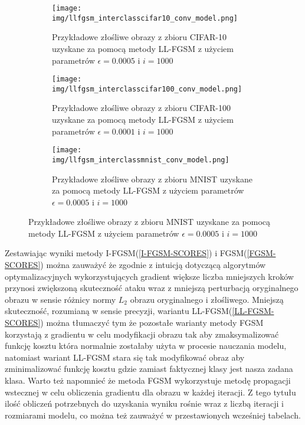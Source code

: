 \documentclass{article}
\begin{document}
\begin{figure}[h!]
    \caption{Przykłady wygenerowanych złośliwych przykładów z zadaną klasą za pomocą metody LL-FGSM}

    \begin{subfigure}[t]{0.48\textwidth}
        \texttt{[image: img/llfgsm\_interclasscifar10\_conv\_model.png]}
        \caption{Przykładowe złośliwe obrazy z zbioru CIFAR-10 uzyskane za pomocą metody LL-FGSM z użyciem parametrów \(\epsilon=0.0005\) i \(i=1000\)}
        \label{fig:cifar10_grid_llfgsm}
    \end{subfigure}%
    \hfill
    \begin{subfigure}[t]{0.48\textwidth}
        \texttt{[image: img/llfgsm\_interclasscifar100\_conv\_model.png]}
        \caption{Przykładowe złośliwe obrazy z zbioru CIFAR-100 uzyskane za pomocą metody LL-FGSM z użyciem parametrów \(\epsilon=0.0001\) i \(i=1000\)}
        \label{fig:cifar100_grid_llfgsm}
    \end{subfigure}%

    \begin{subfigure}[t]{0.48\textwidth}
        \texttt{[image: img/llfgsm\_interclassmnist\_conv\_model.png]}
        \caption{Przykładowe złośliwe obrazy z zbioru MNIST uzyskane za pomocą metody LL-FGSM z użyciem parametrów \(\epsilon=0.0005\) i \(i=1000\)}
        \label{fig:mnist_grid_llfgsm}
    \end{subfigure}%


\end{figure}

Zestawiając wyniki metody I-FGSM(\ref{I-FGSM-SCORES}) i FGSM(\ref{FGSM-SCORES}) można zauważyć że zgodnie z intuicją dotyczącą
algorytmów optymalizacyjnych wykorzystujących gradient większe liczba mniejszych kroków przynosi zwiększoną skuteczność ataku wraz
z mniejszą perturbacją oryginalnego obrazu w sensie różnicy normy \(L_2\) obrazu oryginalnego i złośliwego.
Mniejszą skuteczność, rozumianą w sensie precyzji, wariantu LL-FGSM(\ref{LL-FGSM-SCORES}) można tłumaczyć tym że pozostałe warianty
metody FGSM korzystają z gradientu w celu modyfikacji obrazu tak aby zmaksymalizować funkcję kosztu która normalnie zostałaby użyta w procesie nauczania modelu,
natomiast wariant LL-FGSM stara się tak modyfikować obraz aby zminimalizować funkcję kosztu gdzie zamiast faktycznej klasy jest nasza zadana klasa.
Warto też napomnieć że metoda FGSM wykorzystuje metodę propagacji wstecznej w celu obliczenia gradientu dla obrazu w każdej iteracji.
Z tego tytułu ilość obliczeń potrzebnych do uzyskania wyniku rośnie wraz z liczbą iteracji i rozmiarami modelu, co można też zauważyć w przestawionych wcześniej
tabelach.
\end{document}
